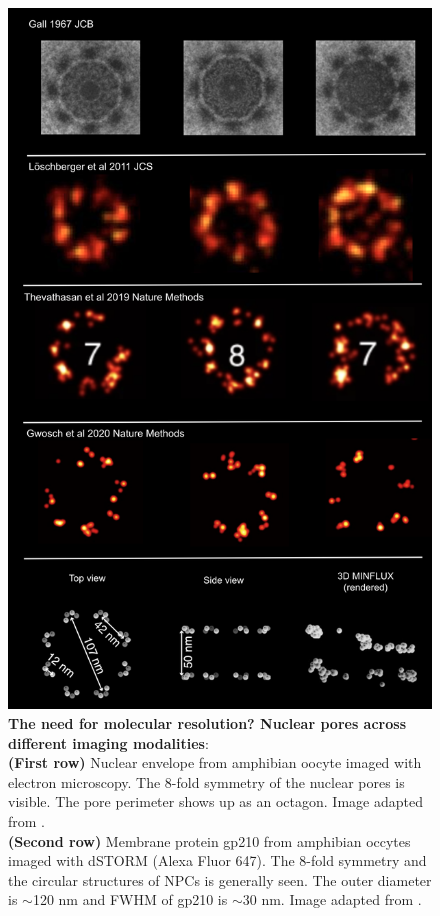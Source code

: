 \documentclass[9pt,twocolumn,twoside]{pnas-new}
\begin{document}
\begin{figure}[h!]
\begin{center}
\includegraphics[width=\linewidth]{Figures/NPC2}
\end{center}
\caption[]{\textbf{The need for molecular resolution? Nuclear pores across different imaging modalities}: \\
\textbf{(First row)} Nuclear envelope from amphibian oocyte imaged with electron microscopy. The 8-fold symmetry of the nuclear pores is visible. The pore perimeter shows up as an octagon. Image adapted from \cite{gall1967octagonal}.\\ 
\textbf{(Second row)} Membrane protein gp210 from amphibian occytes imaged with dSTORM (Alexa Fluor 647). The 8-fold symmetry and the circular structures of NPCs is generally seen. The outer diameter is $\sim$120 nm and FWHM of gp210 is $\sim$30 nm. Image adapted from \cite{loschberger2012super}. \\
}
\end{figure}
\end{document}
